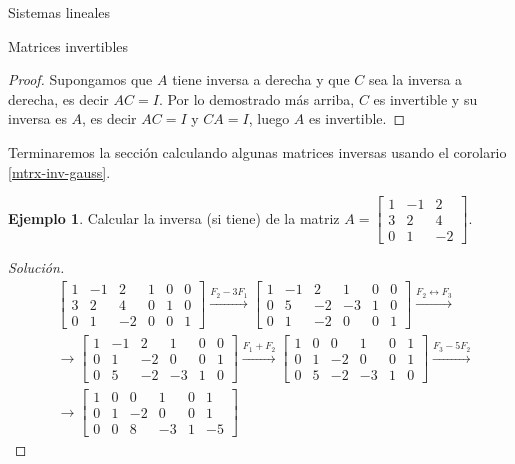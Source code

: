 \documentclass[a4paper,12pt,twoside,spanish]{amsbook}
\theoremstyle{definition}
\newtheorem{ejemplo}{Ejemplo}[section]
\theoremstyle{remark}
\begin{document}
\begin{chapter}{Sistemas lineales}
\begin{section}{Matrices invertibles}
\begin{proof}
				Supongamos que  $A$ tiene inversa a derecha y  que $C$ sea la inversa a derecha, es decir $AC=I$. Por lo demostrado más arriba, $C$ es invertible y su inversa es $A$, es decir $AC=I$ y $CA=I$, luego $A$  es invertible. 
			\end{proof}	
			
			
			
			Terminaremos la  sección calculando algunas matrices inversas usando el corolario  \ref{mtrx-inv-gauss}. 
			
			\begin{ejemplo}
				Calcular la inversa (si tiene) de la matriz $A=\begin{bmatrix}
				1&-1&2\\ 3&2&4\\ 0&1&-2
				\end{bmatrix}$. 
			\end{ejemplo}
			\begin{proof}[Solución]
				\begin{align*} 
				&\left[\begin{array}{rrr|rrr}	1&-1&2&1&0&0\\ 3&2&4&0&1&0\\ 0&1&-2&0&0&1 \end{array}\right]
				\stackrel{F_2-3 F_1}{\longrightarrow}
				\left[\begin{array}{rrr|rrr}	1&-1&2
				&1&0&0\\ 0&5&-2&-3&1&0\\ 0&1&-2&0&0&1 \end{array}\right]
				\stackrel{F_2\leftrightarrow F_3}{\longrightarrow} \\
				&\longrightarrow 
				\left[\begin{array}{rrr|rrr}	1&-1&2&1&0&0\\ 0&1&-2&0&0&1 \\ 0&5&-2&-3&1&0 \end{array}\right]
				\stackrel{F_1 + F_2}{\longrightarrow}
				\left[\begin{array}{rrr|rrr}	1&0&0&1&0&1\\ 0&1&-2&0&0&1 \\ 0&5&-2&-3&1&0 \end{array}\right]
				\stackrel{F_3-5F_2}{\longrightarrow} \\
				&\longrightarrow
				\left[\begin{array}{rrr|rrr}	1&0&0&1&0&1\\ 0&1&-2&0&0&1 \\ 0&0&8&-3&1&-5 \end{array}\right]

\end{align*}
\end{proof}
\end{section}
\end{chapter}
\end{document}
